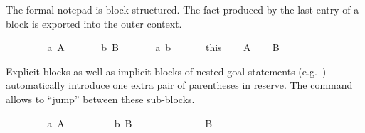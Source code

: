 \begin{isabellebody}
\begin{isamarkuptext}
\begin{itemize}
  \end{itemize}%
\end{isamarkuptext}%
\isamarkuptrue%
%
\isamarkuptrue%
%
\begin{isamarkuptext}%
The formal notepad is block structured.  The fact produced by the last
  entry of a block is exported into the outer context.%
\end{isamarkuptext}%
\isamarkuptrue%
\isamarkupfalse%
\isanewline
{}\isanewline
%
\isadelimproof
\ \ %
\endisadelimproof
%
\isatagproof
{}\isamarkupfalse%
\isanewline
\ \ \ \ \isamarkupfalse%
\ a{}\ A\ \isamarkupfalse%
\isanewline
\ \ \ \ \isamarkupfalse%
\ b{}\ B\ \isamarkupfalse%
\isanewline
\ \ \ \ \isamarkupfalse%
\ a\ b\isanewline
\ \ \isamarkupfalse%
\isanewline
\ \ \isamarkupfalse%
\ this\isanewline
\ \ \isamarkupfalse%
\ {}A{}\isanewline
\ \ \isamarkupfalse%
\ {}B{}%
\endisatagproof
{\isafoldproof}%
%
\isadelimproof
\isanewline
%
\endisadelimproof
{}\isamarkupfalse%
%
\begin{isamarkuptext}%
Explicit blocks as well as implicit blocks of nested goal
  statements (e.g.\ \hyperlink{command.have}{\mbox{}}) automatically introduce one extra
  pair of parentheses in reserve.  The \hyperlink{command.next}{\mbox{}} command allows
  to ``jump'' between these sub-blocks.%
\end{isamarkuptext}%
\isamarkuptrue%
\isamarkupfalse%
\isanewline
{}\isanewline
%
\isadelimproof
\isanewline
\ \ %
\endisadelimproof
%
\isatagproof
{}\isamarkupfalse%
\isanewline
\ \ \ \ \isamarkupfalse%
\ a{}\ A\ \isamarkupfalse%
\isanewline
\ \ \isamarkupfalse%
\isanewline
\ \ \ \ \isamarkupfalse%
\ b{}\ B\isanewline
\ \ \ \ \isamarkupfalse%
\ {}\isanewline
\ \ \ \ \ \ \isamarkupfalse%
\ B\ \isamarkupfalse%

\end{isabellebody}
